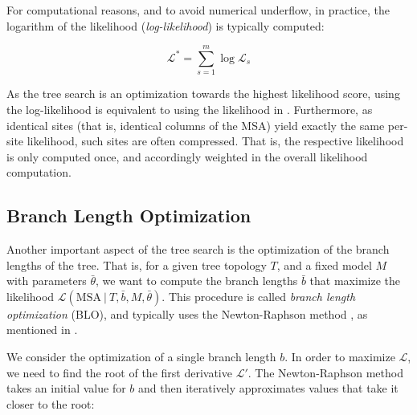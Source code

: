 For computational reasons, and to avoid numerical underflow, in practice,
the logarithm of the likelihood (\emph{log-likelihood}) is typically computed:

\begin{equation}
    \label{ch:Foundations:sec:MLTreeInference:eq:log_likelihood}
    \mathcal{L}^{*} = \sum_{s=1}^{m} \log \mathcal{L}_s
\end{equation}

As the tree search is an optimization towards the highest likelihood score,
using the log-likelihood is equivalent to using the likelihood in .
Furthermore, as identical sites (that is, identical columns of the MSA) yield exactly the same per-site likelihood,
such sites are often compressed.
That is, the respective likelihood is only computed once, and accordingly weighted in the overall likelihood computation.



\subsection{Branch Length Optimization}
\label{ch:Foundations:sec:MLTreeInference:sub:BLO}

Another important aspect of the tree search
is the optimization of the branch lengths of the tree.
That is, for a given tree topology $T$, and a fixed model $M$ with parameters $\bar{\theta}$,
we want to compute the branch lengths $\bar{b}$
that maximize the likelihood $\mathcal{L}( \mbox{MSA} ~|~ T, \bar{b}, M, \bar{\theta} )$.
This procedure is called \emph{branch length optimization} (BLO),
and typically uses the Newton-Raphson method \cite{Ypma1995},
as mentioned in .

We consider the optimization of a single branch length $b$.
In order to maximize $\mathcal{L}$, we need to find the root of the first derivative $\mathcal{L}'$.
The Newton-Raphson method takes an initial value for $b$ and then
iteratively approximates values that take it closer to the root:

